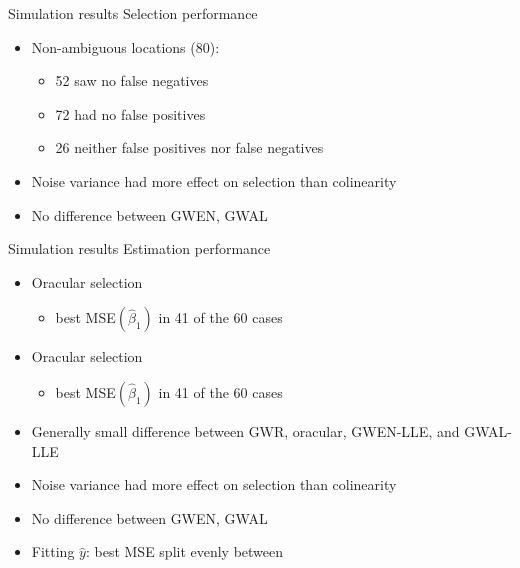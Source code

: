 \documentclass[12pt,t]{beamer}
\newcommand{\subt}[1]{{\footnotesize \color{subtitle} {#1}}}
\begin{document}
\begin{frame}{Simulation results}
\subt{Selection performance}

\bigskip
\begin{itemize}
  \item Non-ambiguous locations (80):
  \begin{itemize}
    \item 52 saw no false negatives
    \item 72 had no false positives
    \item 26 neither false positives nor false negatives
  \end{itemize}

  \item Noise variance had more effect on selection than colinearity
  \item No difference between GWEN, GWAL
\end{itemize}

\end{frame}



	
	
\begin{frame}{Simulation results}
\subt{Estimation performance}


\begin{itemize}
  \item Oracular selection
  \begin{itemize}
    \item best MSE$(\hat{\beta}_1)$ in 41 of the 60 cases
  \end{itemize}

  \item Oracular selection
  \begin{itemize}
    \item best MSE$(\hat{\beta}_1)$ in 41 of the 60 cases
  \end{itemize}

  \item Generally small difference between GWR, oracular, GWEN-LLE, and GWAL-LLE

  \item Noise variance had more effect on selection than colinearity
  \item No difference between GWEN, GWAL

  \item Fitting $\hat{y}$: best MSE split evenly between 
\end{itemize}
\end{frame}
	
\end{document}
